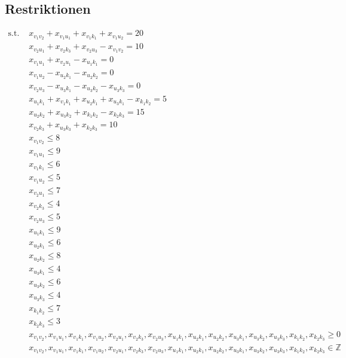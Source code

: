\documentclass[a4paper,11pt]{article}
\begin{document}
\subsection*{Restriktionen}
\begin{align*}
\text{s.t. }
& x_{v_1 v_2} + x_{v_1 u_1} + x_{v_1 k_1} + x_{v_1 u_2} = 20 \\ %
& x_{v_2 u_1} + x_{v_2 k_3} + x_{v_2 u_3} - x_{v_1 v_2} = 10 \\ %
& x_{v_1 u_1} + x_{v_2 u_1} - x_{u_1 k_1} = 0 \\ %
& x_{v_1 u_2} - x_{u_2 k_1} - x_{u_2 k_2} = 0 \\ %
& x_{v_2 u_3} - x_{u_3 k_1} - x_{u_3 k_2} - x_{u_3 k_3} = 0 \\ %
& x_{u_1 k_1} + x_{v_1 k_1} + x_{u_2 k_1} + x_{u_3 k_1} - x_{k_1 k_2} = 5 \\ %
& x_{u_2 k_2} + x_{u_3 k_2} + x_{k_1 k_2} - x_{k_2 k_3} = 15 \\ %
& x_{v_2 k_3} + x_{u_3 k_3} + x_{k_2 k_3} = 10 \\ %
& x_{v_1 v_2} \le 8 \\ %
& x_{v_1 u_1} \le 9 \\ %
& x_{v_1 k_1} \le 6 \\ %
& x_{v_1 u_2} \le 5 \\ %
& x_{v_2 u_1} \le 7 \\ %
& x_{v_2 k_3} \le 4 \\ %
& x_{v_2 u_3} \le 5 \\ %
& x_{u_1 k_1} \le 9 \\ %
& x_{u_2 k_1} \le 6 \\ %
& x_{u_2 k_2} \le 8 \\ %
& x_{u_3 k_1} \le 4 \\ %
& x_{u_3 k_2} \le 6 \\ %
& x_{u_3 k_3} \le 4 \\ %
& x_{k_1 k_2} \le 7 \\ %
& x_{k_2 k_3} \le 3 \\ %
& x_{v_1 v_2},
  x_{v_1 u_1},
  x_{v_1 k_1},
  x_{v_1 u_2},
  x_{v_2 u_1},
  x_{v_2 k_3},
  x_{v_2 u_3},
  x_{u_1 k_1},
  x_{u_2 k_1},
  x_{u_2 k_2},
  x_{u_3 k_1},
  x_{u_3 k_2},
  x_{u_3 k_3},
  x_{k_1 k_2},
  x_{k_2 k_3} \ge 0 \\ %
& x_{v_1 v_2},
  x_{v_1 u_1},
  x_{v_1 k_1},
  x_{v_1 u_2},
  x_{v_2 u_1},
  x_{v_2 k_3},
  x_{v_2 u_3},
  x_{u_1 k_1},
  x_{u_2 k_1},
  x_{u_2 k_2},
  x_{u_3 k_1},
  x_{u_3 k_2},
  x_{u_3 k_3},
  x_{k_1 k_2},
  x_{k_2 k_3} \in \mathbb{Z} %
\end{align*}
\end{document}
